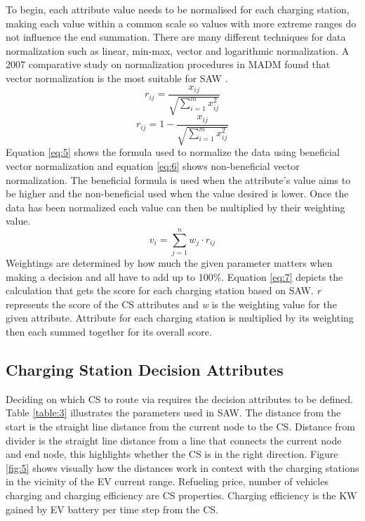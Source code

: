 \documentclass[11pt]{report}
\begin{document}
To begin, each attribute value needs to be normalised for each charging station, making each value within a common scale so values with more extreme ranges do not influence the end summation. There are many different techniques for data normalization such as linear, min-max, vector and logarithmic normalization. A 2007 comparative study on normalization procedures in MADM found that vector normalization is the most suitable for SAW \autocite{chakraborty2007simulation}.
\begin{equation} \label{eq:5}
    r_{ij} = \frac{x_{ij}}{\sqrt{\sum_{i=1}^{m}x_{ij}^{2}}}
\end{equation}
\begin{equation} \label{eq:6}
    r_{ij} = 1 - \frac{x_{ij}}{\sqrt{\sum_{i=1}^{m}x_{ij}^{2}}}
\end{equation}
Equation \ref{eq:5} shows the formula used to normalize the data using beneficial vector normalization and equation \ref{eq:6} shows non-beneficial vector normalization. The beneficial formula is used when the attribute's value aims to be higher and the non-beneficial used when the value desired is lower. Once the data has been normalized each value can then be multiplied by their weighting value. 
\begin{equation} \label{eq:7}
    v_{i}=\sum_{j=1}^{n} w_{j} \cdot r_{ij}
\end{equation}
Weightings are determined by how much the given parameter matters when making a decision and all have to add up to 100\%. Equation \ref{eq:7} depicts the calculation that gets the score for each charging station based on SAW. \emph{r} represents the score of the CS attributes and \emph{w} is the weighting value for the given attribute. Attribute for each charging station is multiplied by its weighting then each summed together for its overall score.

\subsection{Charging Station Decision Attributes}

Deciding on which CS to route via requires the decision attributes to be defined. Table \ref{table:3} illustrates the parameters used in SAW. The distance from the start is the straight line distance from the current node to the CS. Distance from divider is the straight line distance from a line that connects the current node and end node, this highlights whether the CS is in the right direction. Figure \ref{fig:5} shows visually how the distances work in context with the charging stations in the vicinity of the EV current range. Refueling price, number of vehicles charging and charging efficiency are CS properties. Charging efficiency is the KW gained by EV battery per time step from the CS.
\end{document}
